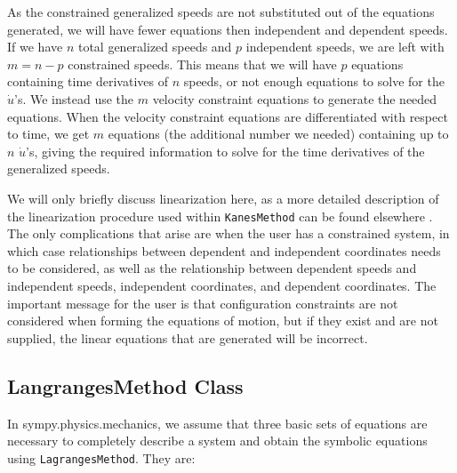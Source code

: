 \documentclass[twocolumn,10pt, final]{asme2e}
\begin{document}
As the constrained generalized speeds are not substituted out of the equations
generated, we will have fewer equations then independent and dependent speeds.
If we have $n$ total generalized speeds and $p$ independent speeds, we are left
with $m=n-p$ constrained speeds.
This means that we will have $p$ equations containing time derivatives of $n$
speeds, or not enough equations to solve for the $\dot{u}$'s.
We instead use the $m$ velocity constraint equations to generate the needed
equations.
When the velocity constraint equations are differentiated with respect to time,
we get $m$ equations (the additional number we needed) containing up to $n$
$\dot{u}$'s, giving the required information to solve for the time derivatives
of the generalized speeds.

We will only briefly discuss linearization here, as a more detailed description
of the linearization procedure used within \verb|KanesMethod| can be found
elsewhere \cite{Peterson2013}.  The only complications that arise are when the
user has a constrained system, in which case relationships between dependent
and independent coordinates needs to be considered, as well as the relationship
between dependent speeds and independent speeds, independent coordinates, and
dependent coordinates.  The important message for the user is that
configuration constraints are not considered when forming the equations of
motion, but if they exist and are not supplied, the linear equations that are
generated will be incorrect.


\subsection*{LangrangesMethod Class}
In sympy.physics.mechanics, we assume that three basic sets of equations are
necessary to completely describe a system and obtain the symbolic equations
using \verb|LagrangesMethod|. They are:
\end{document}
